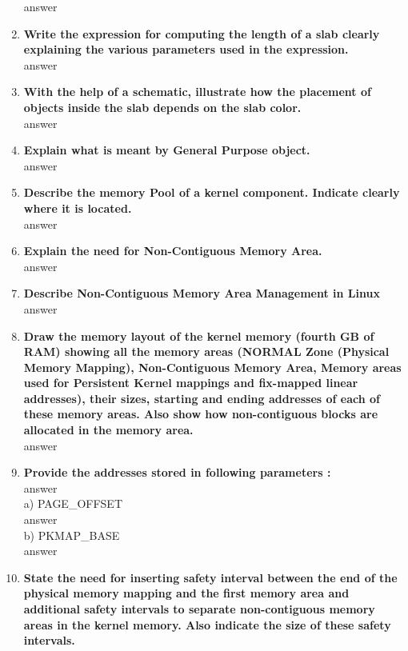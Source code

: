 \documentclass[a4paper,12pt]{article}
\begin{document}
\begin{flushleft}
\begin{enumerate}
{\color{red}answer}\\
\item \textbf{  Write the expression for computing the length of a slab clearly explaining the various parameters used in the expression.}\\
{\color{red}answer}\\
\item \textbf{  With the help of a schematic, illustrate how the placement of objects inside the slab depends on the slab color.}\\
{\color{red}answer}\\
\item \textbf{  Explain what is meant by General Purpose object.}\\
{\color{red}answer}\\
\item \textbf{  Describe the memory Pool of a kernel component. Indicate clearly where it is located.}\\
{\color{red}answer}\\
\item \textbf{  Explain the need for Non-Contiguous Memory Area.}\\
{\color{red}answer}\\
\item \textbf{  Describe Non-Contiguous Memory Area Management in Linux}\\
{\color{red}answer}\\
\item \textbf{  Draw the memory layout of the kernel memory (fourth GB of RAM) showing all the memory areas (NORMAL Zone (Physical Memory Mapping), Non-Contiguous Memory Area, Memory areas used for Persistent Kernel mappings and fix-mapped linear addresses), their sizes, starting and ending addresses of each of these memory areas. Also show how non-contiguous blocks are allocated in the memory area.}\\
{\color{red}answer}\\
\item \textbf{  Provide the addresses stored in following parameters :}\\
{\color{red}answer}\\
a) PAGE\_OFFSET\\{\color{red}answer}\\
 b) PKMAP\_BASE\\{\color{red}answer}\\
\item \textbf{  State the need for inserting safety interval between the end of the physical memory mapping and the first memory area and additional safety intervals to separate non-contiguous memory areas in the kernel memory. Also indicate the size of these safety intervals.}\\

\end{enumerate}
\end{flushleft}
\end{document}
